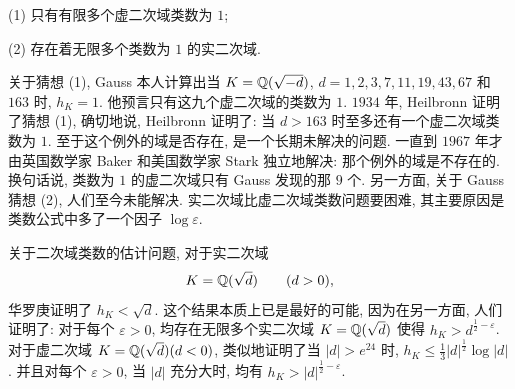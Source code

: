 (1) 只有有限多个虚二次域类数为 $1$;

(2) 存在着无限多个类数为 $1$ 的实二次域.

关于猜想 (1), Gauss 本人计算出当 $K=\mathbb{Q}(\sqrt{-d})$, $d=1,2,3,7,11,19,43,67$ 和 $163$ 时, $h_K=1$. 他预言只有这九个虚二次域的类数为 $1$. $1934$ 年, Heilbronn 证明了猜想 (1), 确切地说, Heilbronn 证明了: 当 $d>163$ 时至多还有一个虚二次域类数为 $1$. 至于这个例外的域是否存在, 是一个长期未解决的问题. 一直到 $1967$ 年才由英国数学家 Baker 和美国数学家 Stark 独立地解决: 那个例外的域是不存在的. 换句话说, 类数为 $1$ 的虚二次域只有 Gauss 发现的那 $9$ 个. 另一方面, 关于 Gauss 猜想 (2), 人们至今未能解决. 实二次域比虚二次域类数问题要困难, 其主要原因是类数公式中多了一个因子 $\log\varepsilon$.

关于二次域类数的估计问题, 对于实二次域
\[
  K=\mathbb{Q}(\sqrt{d})\qquad(d>0),
\]
华罗庚证明了 $h_K<\sqrt{d}$. 这个结果本质上已是最好的可能, 因为在另一方面, 人们证明了: 对于每个 $\varepsilon>0$, 均存在无限多个实二次域 $K=\mathbb{Q}(\sqrt{d})$ 使得 $h_K>d^{\frac{1}{2}-\varepsilon}$. 对于虚二次域 $K=\mathbb{Q}(\sqrt{d})(d<0)$, 类似地证明了当 $|d|>e^{24}$ 时, $h_K\leqslant\frac{1}{3}|d|^{\frac{1}{2}}\log|d|$. 并且对每个 $\varepsilon>0$, 当 $|d|$ 充分大时, 均有 $h_K>|d|^{\frac{1}{2}-\varepsilon}$.
